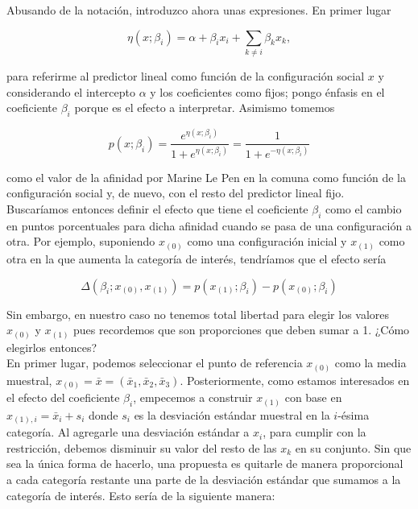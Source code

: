 Abusando de la notación, introduzco ahora unas expresiones. En primer lugar

\begin{equation*}
\eta(x;\beta_i)= \alpha + \beta_i x_i + \sum\limits_{k\neq i} \beta_k x_k, 
\end{equation*} 

para referirme al predictor lineal como función de la configuración social $x$ y considerando el intercepto $\alpha$ y los coeficientes como fijos; pongo énfasis en el coeficiente $\beta_i$ porque es el efecto a interpretar. Asimismo tomemos 

\begin{equation*}
p(x;\beta_i)=\dfrac{e^{\eta(x;\beta_i)}}{1+e^{\eta(x;\beta_i)}}=\dfrac{1}{1+e^{-\eta(x;\beta_i)}}
\end{equation*} 

como el valor de la afinidad por Marine Le Pen en la comuna como función de la configuración social y, de nuevo, con el resto del predictor lineal fijo.\\

 Buscaríamos entonces definir el efecto que tiene el coeficiente $\beta_i$ como el cambio en puntos porcentuales para dicha afinidad cuando se pasa de una configuración a otra. Por ejemplo, suponiendo $x_{(0)}$ como una configuración inicial y $x_{(1)}$ como otra en la que aumenta la categoría de interés, tendríamos que el efecto sería

\begin{equation*}
\Delta(\beta_i;x_{(0)},x_{(1)}) = p(x_{(1)};\beta_i)-p(x_{(0)};\beta_i)
\end{equation*}

Sin embargo, en nuestro caso no tenemos total libertad para elegir los valores $x_{(0)}$ y $x_{(1)}$ pues recordemos que son proporciones que deben sumar a 1. ¿Cómo elegirlos entonces?\\ 

En primer lugar, podemos seleccionar el punto de referencia $x_{(0)}$ como la media muestral, $x_{(0)}=\bar{x}=(\bar{x}_1,\bar{x}_2,\bar{x}_3)$. Posteriormente, como estamos interesados en el efecto del coeficiente $\beta_i$, empecemos a construir $x_{(1)}$ con base en $x_{(1),i}=\bar{x}_i + s_i$ donde $s_i$ es la desviación estándar muestral en la $i$-ésima categoría. Al agregarle una desviación estándar a $x_i$, para cumplir con la restricción, debemos disminuir su valor del resto de las $x_k$ en su conjunto. Sin que sea la única forma de hacerlo, una propuesta es quitarle de manera proporcional a cada categoría restante una parte de la desviación estándar que sumamos a la categoría de interés. Esto sería de la siguiente manera: 

